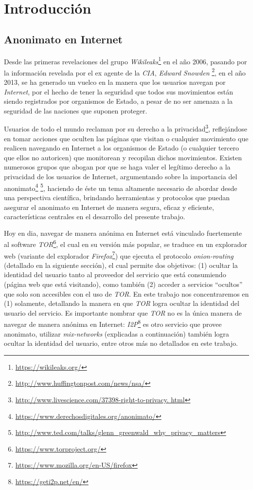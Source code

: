\chapter{Introducción}
\section{Anonimato en Internet}

Desde las primeras revelaciones del grupo \emph{Wikileaks}\footnote{\url{https://wikileaks.org/}} en el año 2006, 
pasando por la información revelada por el ex agente de la \emph{CIA}, \emph{Edward Snowden}
\footnote{\url{http://www.huffingtonpost.com/news/nsa/}}, en el año 2013, se ha generado un vuelco en la manera que 
los usuarios navegan por \emph{Internet}, por el hecho de tener la seguridad que todos sus movimientos están siendo 
registrados por organismos de Estado, a pesar de no ser amenaza a la seguridad de las naciones que suponen proteger.

Usuarios de todo el mundo reclaman por su derecho a la privacidad\footnote{\url{http://www.livescience.com/37398-right-to-privacy.
html}}, reflejándose en tomar acciones que oculten las páginas que visitan o cualquier movimiento que realicen 
navegando en Internet a los organismos de Estado (o cualquier tercero que ellos no autoricen) que monitorean y 
recopilan dichos movimientos. Existen numerosos grupos que abogan por que se haga valer el legítimo derecho a la 
privacidad de los usuarios de Internet, argumentando sobre la importancia del anonimato\footnote{\url{https://www.derechosdigitales.org/anonimato/}} 
\footnote{\url{http://www.ted.com/talks/glenn_greenwald_why_privacy_matters}}, haciendo de éste un tema altamente 
necesario de abordar desde una perspectiva científica, brindando herramientas y protocolos que puedan asegurar el 
anonimato en Internet de manera segura, eficaz y eficiente, características centrales en el desarrollo del presente trabajo.

Hoy en dia, navegar de manera anónima en Internet está vinculado fuertemente al software \emph{TOR}\footnote{\url{https://www.torproject.org/}}, 
el cual en su versión más popular, se traduce en un explorador web (variante del explorador 
\emph{Firefox}\footnote{\url{https://www.mozilla.org/en-US/firefox}}) que ejecuta el protocolo \emph{onion-routing} 
(detallado en la siguiente sección), el cual permite dos objetivos: (1) ocultar la identidad del usuario tanto al proveedor 
del servicio que está consumiendo (página web que está visitando), como también (2) acceder a servicios ``ocultos'' que solo 
son accesibles con el uso de \emph{TOR}. En este trabajo nos concentraremos en (1) solamente, detallando la manera en que 
\emph{TOR} logra ocultar la identidad del usuario del servicio. Es importante nombrar que \emph{TOR} no es la única manera de 
navegar de manera anónima en Internet: \emph{I2P}\footnote{\url{https://geti2p.net/en/}} es otro servicio que provee anonimato, 
utilizar \emph{mix-networks} (explicadas a continuación) también logra ocultar la identidad del usuario, entre otros más no 
detallados en este trabajo.

